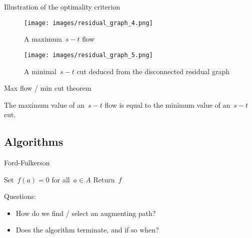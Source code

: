 \documentclass{beamer}
\begin{document}
\begin{frame}{Illustration of the optimality criterion} \pause
  \begin{figure}
    \begin{minipage}{0.65\linewidth}
      \texttt{[image: images/residual\_graph\_4.png]}
    \end{minipage}
    \begin{minipage}{0.3\linewidth}
      \caption{A maximum~$s-t$ flow}
    \end{minipage}
  \end{figure}
  \vfill \pause
  \begin{figure}
    \begin{minipage}{0.65\linewidth}
      \texttt{[image: images/residual\_graph\_5.png]}
    \end{minipage}
    \begin{minipage}{0.3\linewidth}
      \caption{A minimal~$s-t$ cut deduced from the disconnected residual graph}
    \end{minipage}
  \end{figure}
\end{frame}

\begin{frame}[t]{Max flow / min cut theorem} \pause
  \begin{theorem}[6.5]
    The maximum value of an~$s-t$ flow is equal to the minimum value of an~$s-t$ cut. 
  \end{theorem}
\end{frame}

\subsection{Algorithms}

\begin{frame}[t]{Ford-Fulkerson}
  \setcounter{algocf}{4}
  \begin{algorithm}[H]
        \caption{Ford-Fulkerson algorithm}
   \SetAlgoLined \pause
    \pause
   Set~$f(a) = 0$ for all~$a \in A$\; \pause
    \pause
   Return~$f$
  \end{algorithm}
  \vfill \pause
  Questions: \pause
  \begin{itemize}
    \item How do we find / select an augmenting path? \pause
    \item Does the algorithm terminate, and if so when?
  \end{itemize}
\end{frame}
\end{document}
